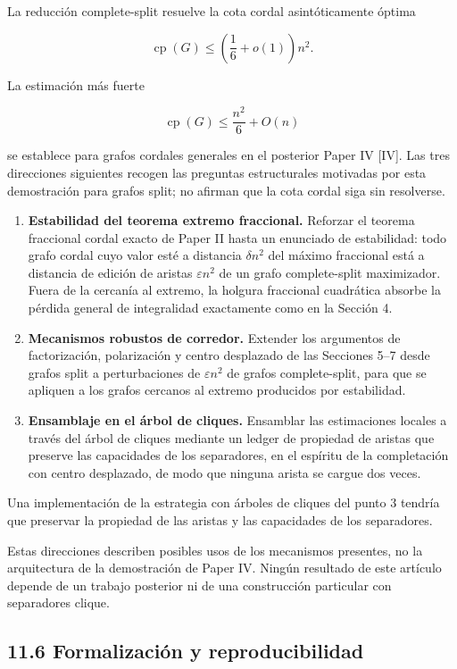 \documentclass[spanish,11pt,a4paper]{article}
\begin{document}
La reducción complete-split resuelve la cota cordal asintóticamente
óptima

\[
\operatorname{cp}(G)
\le
\left(\frac16+o(1)\right)n^2.
\]

La estimación más fuerte

\[
\operatorname{cp}(G)
\le
\frac{n^2}{6}+O(n)
\]

se establece para grafos cordales generales en el posterior Paper IV
{[}IV{]}. Las tres direcciones siguientes recogen las preguntas
estructurales motivadas por esta demostración para grafos split; no
afirman que la cota cordal siga sin resolverse.

\begin{enumerate}
\def\labelenumi{\arabic{enumi}.}
\item
  \textbf{Estabilidad del teorema extremo fraccional.} Reforzar el
  teorema fraccional cordal exacto de Paper II hasta un enunciado de
  estabilidad: todo grafo cordal cuyo valor esté a distancia
  \(\delta n^2\) del máximo fraccional está a distancia de edición de
  aristas \(\varepsilon n^2\) de un grafo complete-split maximizador.
  Fuera de la cercanía al extremo, la holgura fraccional cuadrática
  absorbe la pérdida general de integralidad exactamente como en la
  Sección 4.
\item
  \textbf{Mecanismos robustos de corredor.} Extender los argumentos de
  factorización, polarización y centro desplazado de las Secciones 5--7
  desde grafos split a perturbaciones de \(\varepsilon n^2\) de grafos
  complete-split, para que se apliquen a los grafos cercanos al extremo
  producidos por estabilidad.
\item
  \textbf{Ensamblaje en el árbol de cliques.} Ensamblar las estimaciones
  locales a través del árbol de cliques mediante un ledger de propiedad
  de aristas que preserve las capacidades de los separadores, en el
  espíritu de la completación con centro desplazado, de modo que ninguna
  arista se cargue dos veces.
\end{enumerate}

Una implementación de la estrategia con árboles de cliques del punto 3
tendría que preservar la propiedad de las aristas y las capacidades de
los separadores.

Estas direcciones describen posibles usos de los mecanismos presentes,
no la arquitectura de la demostración de Paper IV. Ningún resultado de
este artículo depende de un trabajo posterior ni de una construcción
particular con separadores clique.

\subsection{11.6 Formalización y
reproducibilidad}\label{formalizaciuxf3n-y-reproducibilidad}
\end{document}
